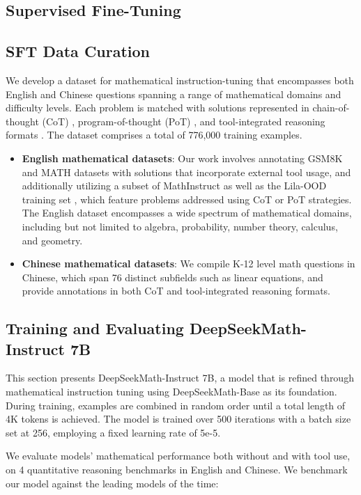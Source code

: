 \begin{itemize}[topsep=0pt]
\section{Supervised Fine-Tuning}

\subsection{SFT Data Curation}

We develop a dataset for mathematical instruction-tuning that encompasses both English and Chinese questions spanning a range of mathematical domains and difficulty levels. Each problem is matched with solutions represented in chain-of-thought (CoT) \citep{cot}, program-of-thought (PoT) \citep{pot,pal}, and tool-integrated reasoning formats \citep{tora}. The dataset comprises a total of 776,000 training examples.

\begin{itemize}[topsep=0pt]
    \item \textbf{English mathematical datasets}: Our work involves annotating GSM8K and MATH datasets with solutions that incorporate external tool usage, and additionally utilizing a subset of MathInstruct \citep{MathInstruct} as well as the Lila-OOD training set \citep{lila}, which feature problems addressed using CoT or PoT strategies. The English dataset encompasses a wide spectrum of mathematical domains, including but not limited to algebra, probability, number theory, calculus, and geometry.
    \item \textbf{Chinese mathematical datasets}: We compile K-12 level math questions in Chinese, which span 76 distinct subfields such as linear equations, and provide annotations in both CoT and tool-integrated reasoning formats.
\end{itemize}

\subsection{Training and Evaluating DeepSeekMath-Instruct 7B}

This section presents DeepSeekMath-Instruct 7B, a model that is refined through mathematical instruction tuning using DeepSeekMath-Base as its foundation. During training, examples are combined in random order until a total length of 4K tokens is achieved. The model is trained over 500 iterations with a batch size set at 256, employing a fixed learning rate of 5e-5.

We evaluate models' mathematical performance both without and with tool use, on 4 quantitative reasoning benchmarks in English and Chinese. We benchmark our model against the leading models of the time:


\end{itemize}
